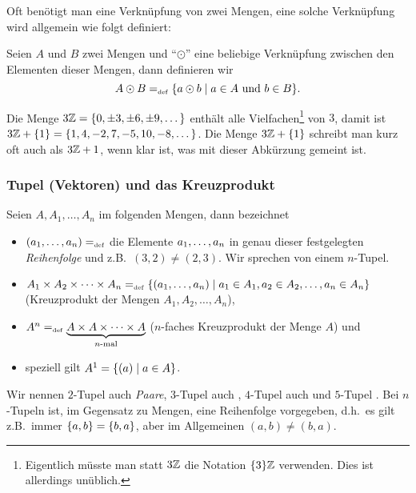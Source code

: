 Oft benötigt man eine Verknüpfung von zwei Mengen, eine solche
Verknüpfung wird allgemein wie folgt definiert:

\begin{definition}
Seien $A$ und $B$ zwei Mengen und "`$\odot$"' eine beliebige
Verknüpfung zwischen den Elementen dieser Mengen, dann definieren wir
\begin{displaymath}
A \odot B =_{\mathrm{\scriptscriptstyle def}} \{a \odot b \mid a \in A \text{ und } b \in B\}.
\end{displaymath}
\end{definition}

\begin{example}
Die Menge $3\mathbb Z = \{0, \pm 3, \pm 6, \pm 9, \dots\}$ enthält alle
Vielfachen\footnote{Eigentlich müsste man statt $3\mathbb Z$ die Notation
$\{3\}\mathbb Z$ verwenden. Dies ist allerdings unüblich.} von $3$, damit
ist $3\mathbb Z + \{1\} = \{1,\allowbreak 4,\allowbreak -2,\allowbreak
7,\allowbreak -5, 10, -8, \dots\}$. Die Menge $3\mathbb Z + \{1\}$ schreibt
man kurz oft auch als $3\mathbb Z + 1$, wenn klar ist, was mit dieser
Abkürzung gemeint ist.
\end{example}

\subsubsection{Tupel (Vektoren) und das Kreuzprodukt}
Seien $A, A_1, \dots , A_n$ im folgenden Mengen, dann bezeichnet

\begin{itemize}
  \item $({a_{1}}, \allowbreak \dots , \allowbreak{a_{n}}) =_{\mathrm{\scriptscriptstyle def}}$ die Elemente ${a_{1}}, \allowbreak \dots , \allowbreak{a_{n}}$ in genau dieser
  festgelegten \emph{Reihenfolge} und z.B.~$(3,2) \not= (2,3)$. Wir
  sprechen von einem $n$-Tupel.
  \item $A_1 \times A_2 \times \dots \times
  A_n =_{\mathrm{\scriptscriptstyle def}} \{({a_{1}}, \allowbreak \dots , \allowbreak{a_{n}}) \mid a_1 \in A_1, a_2 \in A_2, \dots
  ,a_n \in A_n \}$ (Kreuzprodukt der Mengen $A_1, A_2, \dots ,
  A_n$)\index{$\times$},
  \item $A^n =_{\mathrm{\scriptscriptstyle def}} \underbrace{A \times A \times \dots \times
  A}_{n\text{-mal}}$ ($n$-faches Kreuzprodukt der Menge $A$) und
  \item speziell gilt $A^1 = \{(a) \mid a \in A\}$.
\end{itemize}
Wir nennen $2$-Tupel auch \emph{Paare}, $3$-Tupel
auch , $4$-Tupel auch  und $5$-Tupel 
. Bei $n$-Tupeln ist, im Gegensatz zu Mengen, eine 
Reihenfolge vorgegeben, d.h.~es gilt z.B.~immer $\{a,b\} = \{b,a\}$, aber 
im Allgemeinen $(a,b) \not= (b,a)$.

